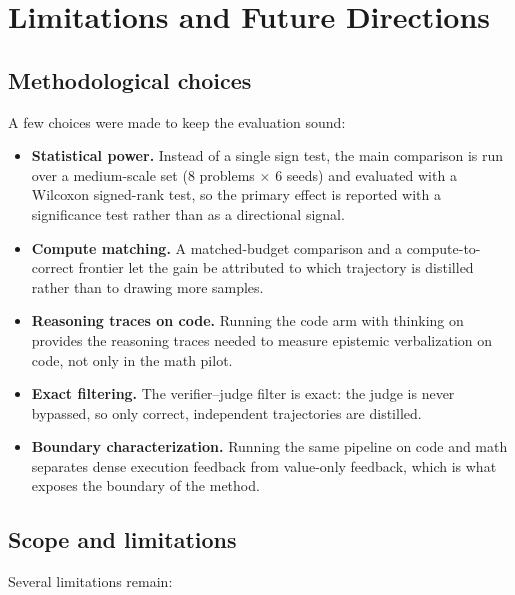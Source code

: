 \chapter{Limitations and Future Directions}\label{chapter-6-limitations-and-publication-roadmap}

\section{Methodological choices}\label{methodological-rigor-and-validations}

A few choices were made to keep the evaluation sound:

\begin{itemize}
\tightlist
\item
  \textbf{Statistical power.} Instead of a single sign test, the main comparison is run over a medium-scale set (8 problems $\times$ 6 seeds) and evaluated with a Wilcoxon signed-rank test, so the primary effect is reported with a significance test rather than as a directional signal.
\item
  \textbf{Compute matching.} A matched-budget comparison and a compute-to-correct frontier let the gain be attributed to which trajectory is distilled rather than to drawing more samples.
\item
  \textbf{Reasoning traces on code.} Running the code arm with thinking on provides the reasoning traces needed to measure epistemic verbalization on code, not only in the math pilot.
\item
  \textbf{Exact filtering.} The verifier--judge filter is exact: the judge is never bypassed, so only correct, independent trajectories are distilled.
\item
  \textbf{Boundary characterization.} Running the same pipeline on code and math separates dense execution feedback from value-only feedback, which is what exposes the boundary of the method.
\end{itemize}

\section{Scope and limitations}\label{scope-and-remaining-limitations}

Several limitations remain:

